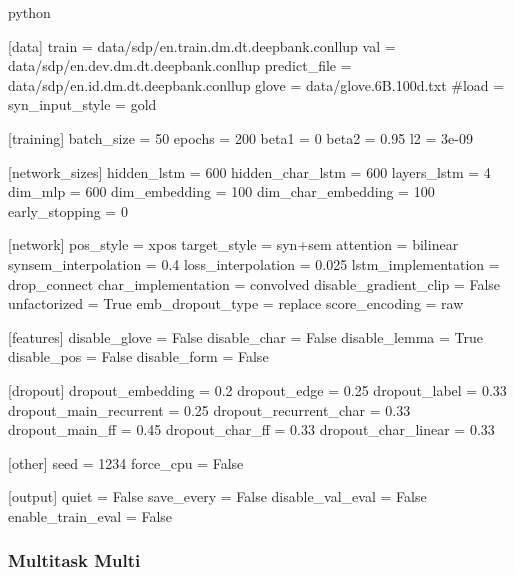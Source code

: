 \documentclass[11pt]{scrartcl}
\begin{document}
\begin{mintedbox}{python}

[data]
train                  = data/sdp/en.train.dm.dt.deepbank.conllup
val                    = data/sdp/en.dev.dm.dt.deepbank.conllup
predict_file           = data/sdp/en.id.dm.dt.deepbank.conllup
glove                  = data/glove.6B.100d.txt
#load                   = 
syn_input_style        = gold

[training]
batch_size             = 50
epochs                 = 200
beta1                  = 0
beta2                  = 0.95
l2                     = 3e-09

[network_sizes]
hidden_lstm            = 600
hidden_char_lstm       = 600
layers_lstm            = 4
dim_mlp                = 600
dim_embedding          = 100
dim_char_embedding     = 100
early_stopping         = 0

[network]
pos_style              = xpos
target_style           = syn+sem 
attention              = bilinear
synsem_interpolation   = 0.4
loss_interpolation     = 0.025
lstm_implementation    = drop_connect
char_implementation    = convolved
disable_gradient_clip  = False
unfactorized           = True
emb_dropout_type       = replace
score_encoding         = raw

[features]
disable_glove          = False
disable_char           = False
disable_lemma          = True
disable_pos            = False
disable_form           = False

[dropout]
dropout_embedding      = 0.2
dropout_edge           = 0.25
dropout_label          = 0.33
dropout_main_recurrent = 0.25
dropout_recurrent_char = 0.33
dropout_main_ff        = 0.45
dropout_char_ff        = 0.33
dropout_char_linear    = 0.33

[other]
seed                   = 1234
force_cpu              = False

[output]
quiet                  = False
save_every             = False
disable_val_eval       = False
enable_train_eval      = False


\end{mintedbox}

\subsubsection{Multitask Multi}
\end{document}
